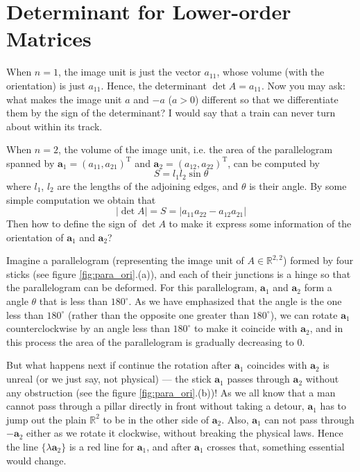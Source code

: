 \documentclass{article}
\begin{document}
\section{Determinant for Lower-order Matrices}
When $n=1$, the image unit is just the vector $a_{11}$, whose volume (with the orientation) is just $a_{11}$. Hence, the determinant $\det A = a_{11}$. Now you may ask: what makes the image unit $a$ and $-a$ ($a>0$) different so that we differentiate them by the sign of the determinant? I would say that a train can never turn about within its track.

When $n=2$, the volume of the image unit, i.e. the area of the parallelogram spanned by $\pmb{a}_1 = (a_{11}, a_{21})^\text{T}$ and $\pmb{a}_2 = (a_{12}, a_{22})^\text{T}$, can be computed by
$$ S = l_1l_2\sin\theta $$
where $l_1$, $l_2$ are the lengths of the adjoining edges, and $\theta$ is their angle. By some simple computation we obtain that 
$$ |\det A| = S = |a_{11}a_{22}-a_{12}a_{21}| $$
Then how to define the sign of $\det A$ to make it express some information of the orientation of $\pmb{a}_1$ and $\pmb{a}_2$? 

Imagine a parallelogram (representing the image unit of $A\in\mathbb{R}^{2,2}$) formed by four sticks (see figure \ref{fig:para_ori}.(a)), and each of their junctions is a hinge so that the parallelogram can be deformed. For this parallelogram, $\pmb{a}_1$ and $\pmb{a}_2$ form a angle $\theta$ that is less than $180^\circ$. As we have emphasized that the angle is the one less than $180^\circ$ (rather than the opposite one greater than $180^\circ$), we can rotate $\pmb{a}_1$ counterclockwise by an angle less than $180^\circ$ to make it coincide with $\pmb{a}_2$, and in this process the area of the parallelogram is gradually decreasing to $0$. 

But what happens next if continue the rotation after $\pmb{a}_1$ coincides with $\pmb{a}_2$ is unreal (or we just say, not physical) — the stick $\pmb{a}_1$ passes through $\pmb{a}_2$ without any obstruction (see the figure \ref{fig:para_ori}.(b))! As we all know that a man cannot pass through a pillar directly in front without taking a detour, $\pmb{a}_1$ has to jump out the plain $\mathbb{R}^2$ to be in the other side of $\pmb{a}_2$. Also, $\pmb{a}_1$ can not pass through $-\pmb{a}_2$ either as we rotate it clockwise, without breaking the physical laws. Hence the line $\{\lambda\pmb{a}_2\}$ is a red line for $\pmb{a}_1$, and after $\pmb{a}_1$ crosses that, something essential would change.
\end{document}
